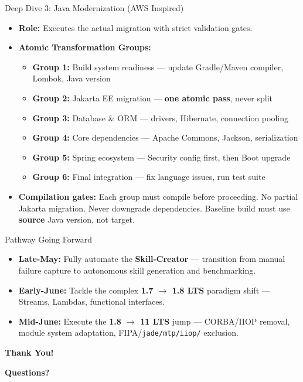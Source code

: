 \documentclass[aspectratio=169]{beamer}
\begin{document}
\begin{frame}{Deep Dive 3: Java Modernization (AWS Inspired)}
\begin{itemize}
  \item \textbf{Role:} Executes the actual migration with strict validation gates.
  \item \textbf{Atomic Transformation Groups:}
  \begin{itemize}
    \item \textbf{Group 1:} Build system readiness --- update Gradle/Maven compiler, Lombok, Java version
    \item \textbf{Group 2:} Jakarta EE migration --- \textbf{one atomic pass}, never split
    \item \textbf{Group 3:} Database \& ORM --- drivers, Hibernate, connection pooling
    \item \textbf{Group 4:} Core dependencies --- Apache Commons, Jackson, serialization
    \item \textbf{Group 5:} Spring ecosystem --- Security config first, then Boot upgrade
    \item \textbf{Group 6:} Final integration --- fix language issues, run test suite
  \end{itemize}
  \item \textbf{Compilation gates:} Each group must compile before proceeding. No partial Jakarta migration. Never downgrade dependencies. Baseline build must use \textbf{source} Java version, not target.
\end{itemize}
\end{frame}

\begin{frame}{Pathway Going Forward}
\begin{itemize}
  \item \textbf{Late-May:} Fully automate the \textbf{Skill-Creator} --- transition from manual failure capture to autonomous skill generation and benchmarking.
  \item \textbf{Early-June:} Tackle the complex \textbf{1.7 $\rightarrow$ 1.8 LTS} paradigm shift --- Streams, Lambdas, functional interfaces.
  \item \textbf{Mid-June:} Execute the \textbf{1.8 $\rightarrow$ 11 LTS} jump --- CORBA/IIOP removal, module system adaptation, FIPA/\texttt{jade/mtp/iiop/} exclusion.
\end{itemize}
\end{frame}

\begin{frame}[plain]
  \centering
  \Huge \textbf{Thank You!}

  \vspace{1.2em}
  \Large \textbf{Questions?}
\end{frame}
\end{document}

